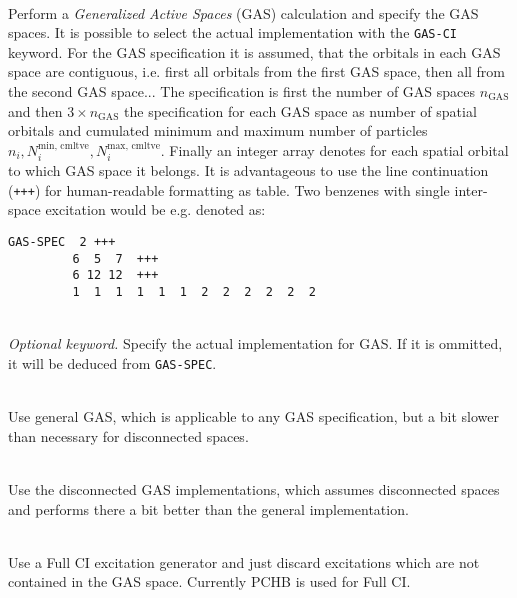 \documentclass[a4paper,notitlepage,dvipsnames]{scrreprt}
\newcommand\codeitem[1]{\needspace{1.5\baselineskip}\item[\textnormal{\ttfamily #1 \nopagebreak}] \hfill \\ \nopagebreak}
\begin{document}
\begin{description}
  \codeitem{GAS-SPEC}
    Perform a \emph{Generalized Active Spaces} (GAS) calculation and specify
      the GAS spaces.
    It is possible to select the actual implementation with the
      \texttt{GAS-CI} keyword.
    For the GAS specification it is assumed, that the orbitals
      in each GAS space are contiguous, i.e. first all orbitals
      from the first GAS space, then all from the second GAS space...
    The specification is first the number of GAS spaces $n_\text{GAS}$
      and then $3 \times n_\text{GAS}$ the specification for each GAS space
      as number of spatial orbitals and cumulated minimum and maximum
      number of particles
      $n_i, N_i^\text{min, cmltve}, N_i^\text{max, cmltve}$.
    Finally an integer array denotes for each spatial orbital to which GAS space it belongs.
    It is advantageous to use the line continuation (\texttt{+++})
      for human-readable formatting as table.
    Two benzenes with single inter-space excitation would be e.g. denoted as:

    \begin{lstlisting}[gobble=4]
    GAS-SPEC  2 +++
         6  5  7  +++
         6 12 12  +++
         1  1  1  1  1  1  2  2  2  2  2  2
    \end{lstlisting}

  \codeitem{GAS-CI}
    \emph{Optional keyword.}
    Specify the actual implementation for GAS.
    If it is ommitted, it will be deduced from \texttt{GAS-SPEC}.
    \begin{description}
      \codeitem{GENERAL}
        Use general GAS, which is applicable to any GAS specification,
          but a bit slower than necessary for disconnected spaces.
      \codeitem{DISCONNECTED}
        Use the disconnected GAS implementations, which assumes disconnected
          spaces and performs there a bit better than the general implementation.
      \codeitem{DISCARDING}
        Use a Full CI excitation generator and just discard excitations which
          are not contained in the GAS space.
        Currently PCHB is used for Full CI.
    \end{description}
\end{description}
\end{document}
